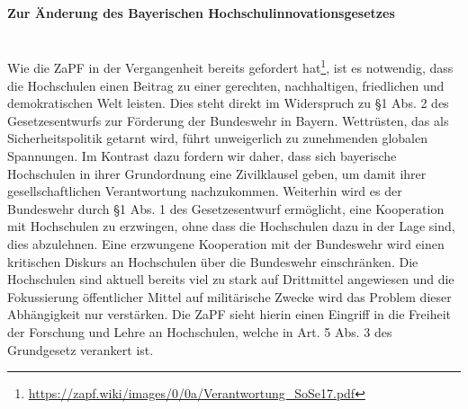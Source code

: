 \documentclass[DIV=calc]{scrartcl}
\let\oldgrqq=\grqq
\def\grqq{\oldgrqq\xspace}
\begin{document}
\paragraph{Zur Änderung des Bayerischen Hochschulinnovationsgesetzes} \mbox{}\\
Wie die ZaPF in der Vergangenheit bereits gefordert hat\footnote{\url{https://zapf.wiki/images/0/0a/Verantwortung_SoSe17.pdf}}, ist es notwendig, dass die Hochschulen einen Beitrag zu einer gerechten, nachhaltigen, friedlichen und demokratischen Welt leisten. Dies steht direkt im Widerspruch zu §1 Abs. 2 des Gesetzesentwurfs zur Förderung der Bundeswehr in Bayern. Wettrüsten, das als \glqq Sicherheitspolitik\grqq getarnt wird, führt unweigerlich zu zunehmenden globalen Spannungen. Im Kontrast dazu fordern wir daher, dass sich bayerische Hochschulen in ihrer Grundordnung eine Zivilklausel geben, um damit ihrer gesellschaftlichen Verantwortung nachzukommen. Weiterhin wird es der Bundeswehr durch §1 Abs. 1 des Gesetzesentwurf ermöglicht, eine Kooperation mit Hochschulen zu erzwingen, ohne dass die Hochschulen dazu in der Lage sind, dies abzulehnen. Eine erzwungene Kooperation mit der Bundeswehr wird einen kritischen Diskurs an Hochschulen über die Bundeswehr einschränken. Die Hochschulen sind aktuell bereits viel zu stark auf Drittmittel angewiesen und die Fokussierung öffentlicher Mittel auf militärische Zwecke wird das Problem dieser Abhängigkeit nur verstärken. Die ZaPF sieht hierin einen Eingriff in die Freiheit der Forschung und Lehre an Hochschulen, welche in Art. 5 Abs. 3 des Grundgesetz verankert ist.
\end{document}

